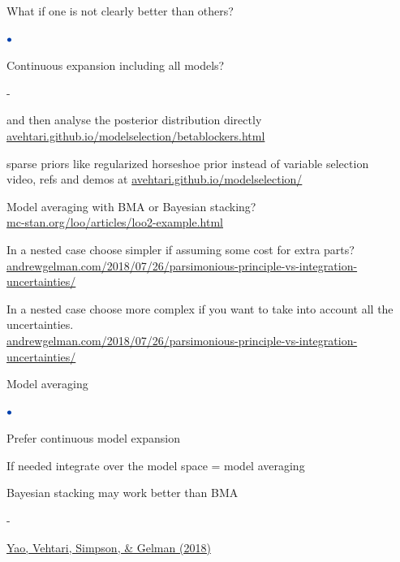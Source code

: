 \documentclass[english,t]{beamer}
\newenvironment{list1}{
   \begin{list}{$\color{list1}\bullet$}{\itemsep=6pt}}{
  \end{list}}
\newenvironment{list2}{
  \begin{list}{-}{\baselineskip=12pt\itemsep=2pt}}{
  \end{list}}
\begin{document}
\begin{frame}{}

  {\Large\color{navyblue}  What if one is not clearly better than others?}

  \begin{list1}
  \item<2-> Continuous expansion including all models?
    \begin{list2}
    \item and then analyse the posterior distribution directly\\
        {\small \url{avehtari.github.io/modelselection/betablockers.html}}
      \item sparse priors like regularized horseshoe prior instead of variable selection\\
        {\small video, refs and demos at
          \url{avehtari.github.io/modelselection/}}
    \end{list2}
  \item<3-> Model averaging with BMA or Bayesian stacking?\\
    {\small \url{mc-stan.org/loo/articles/loo2-example.html}}
  \item<4-> In a nested case choose simpler if assuming some cost for
    extra parts?\\
    {\small \url{andrewgelman.com/2018/07/26/parsimonious-principle-vs-integration-uncertainties/}}
  \item<5-> In a nested case choose more complex if you want to take
    into account all the uncertainties.\\
    {\small \url{andrewgelman.com/2018/07/26/parsimonious-principle-vs-integration-uncertainties/}}
  \end{list1}

\end{frame}

\begin{frame}

  {\Large\color{navyblue} Model averaging}
  
  \begin{list1}
  \item<+-> Prefer continuous model expansion
  \item<+-> If needed integrate over the model space = model averaging
  \item<+-> Bayesian stacking may work better than BMA
    \begin{list2}
    \item \href{https://projecteuclid.org/euclid.ba/1516093227}{Yao, Vehtari, Simpson, \& Gelman (2018)}
    \end{list2}
  \end{list1}
  
\end{frame}
\end{document}
